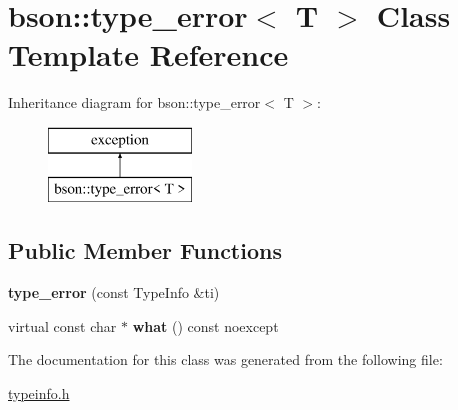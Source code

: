 \hypertarget{classbson_1_1type__error}{\section{bson\+:\+:type\+\_\+error$<$ T $>$ Class Template Reference}
\label{classbson_1_1type__error}
}
Inheritance diagram for bson\+:\+:type\+\_\+error$<$ T $>$\+:\begin{figure}[H]
\begin{center}
\leavevmode
\includegraphics[height=2.000000cm]{classbson_1_1type__error}
\end{center}
\end{figure}
\subsection*{Public Member Functions}
\begin{DoxyCompactItemize}
\item 
\hypertarget{classbson_1_1type__error_a14050384ee0b381c905caa1cf68991ec}{{\bfseries type\+\_\+error} (const Type\+Info \&ti)}\label{classbson_1_1type__error_a14050384ee0b381c905caa1cf68991ec}

\item 
\hypertarget{classbson_1_1type__error_ac7ca3c1cfb5c8ae9865b3385c3e3d327}{virtual const char $\ast$ {\bfseries what} () const noexcept}\label{classbson_1_1type__error_ac7ca3c1cfb5c8ae9865b3385c3e3d327}

\end{DoxyCompactItemize}


The documentation for this class was generated from the following file\+:\begin{DoxyCompactItemize}
\item 
\hyperlink{typeinfo_8h}{typeinfo.\+h}\end{DoxyCompactItemize}

